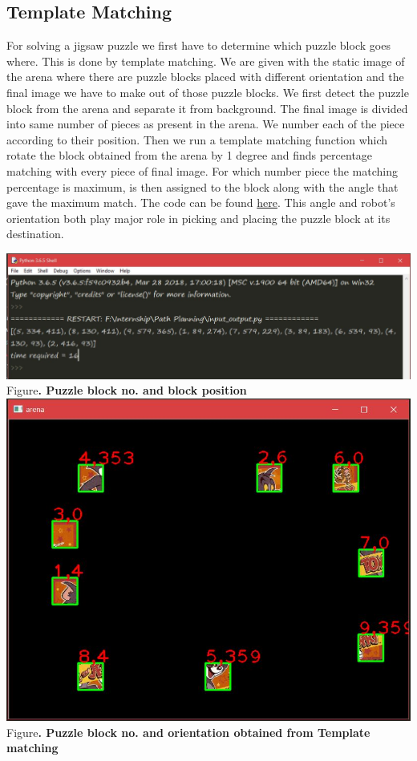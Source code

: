 \documentclass[a4paper,12pt,oneside]{book}
\begin{document}
\subsection*{Template Matching}
For solving a jigsaw puzzle we first have to determine which puzzle block goes where. This is done by template matching. We are given with the static image of the arena where there are puzzle blocks placed with different orientation and the final image we have to make out of those puzzle blocks. We first detect the puzzle block from the arena and separate it from background. The final image is divided into same number of pieces as present in the arena. We number each of the piece according to their position. Then we run a template matching function which rotate the block obtained from the arena by 1 degree and finds percentage matching with every piece of final image. For which number piece the matching percentage is maximum, is then
assigned to the block along with the angle that gave the maximum match. The code can be found \href{https://github.com/eYSIP-2018/Jigsaw_Puzzle_Solver_using_Multiple_Robots/blob/master/Scripts/arena and puzzle block detection/input_output.py}{here}. This angle and robot's orientation both play major role in picking and placing the puzzle block at its destination.
\begin{center}
\includegraphics[scale = 0.35]{templatem.jpg}\\
\small{Figure\textbf{. Puzzle block no. and block position}}\\
\includegraphics[scale = 0.4]{template.jpg}\\
\small{Figure\textbf{. Puzzle block no. and orientation obtained from Template matching}}\\
\end{center}
\end{document}
